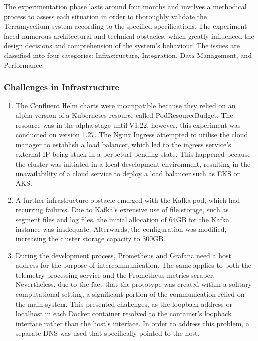 \documentclass{ieeeaccess}
\begin{document}
The experimentation phase lasts around four months and involves a methodical process to assess each situation in order to thoroughly validate the Terramycelium system according to the specified specifications. The experiment faced numerous architectural and technical obstacles, which greatly influenced the design decisions and comprehension of the system's behaviour. The issues are classified into four categories: Infrastructure, Integration, Data Management, and Performance.

\subsubsection{Challenges in Infrastructure} 

\begin{enumerate}[label=({\alph*}) , leftmargin=30px]

    \item The Confluent Helm charts were incompatible because they relied on an alpha version of a Kubernetes resource called PodResourceBudget. The resource was in the alpha stage until V1.22, however, this experiment was conducted on version 1.27. The Nginx Ingress attempted to utilise the cloud manager to establish a load balancer, which led to the ingress service's external IP being stuck in a perpetual pending state. This happened because the cluster was initiated in a local development environment, resulting in the unavailability of a cloud service to deploy a load balancer such as EKS or AKS.

    \item A further infrastructure obstacle emerged with the Kafka pod, which had recurring failures. Due to Kafka's extensive use of file storage, such as segment files and log files, the initial allocation of 64GB for the Kafka instance was inadequate. Afterwards, the configuration was modified, increasing the cluster storage capacity to 300GB.

    \item During the development process, Prometheus and Grafana need a host address for the purpose of intercommunication. The same applies to both the telemetry processing service and the Prometheus metrics scraper. Nevertheless, due to the fact that the prototype was created within a solitary computational setting, a significant portion of the communication relied on the main system. This presented challenges, as the loopback address or localhost in each Docker container resolved to the container's loopback interface rather than the host's interface. In order to address this problem, a separate DNS was used that specifically pointed to the host.

\end{enumerate} 
\end{document}
